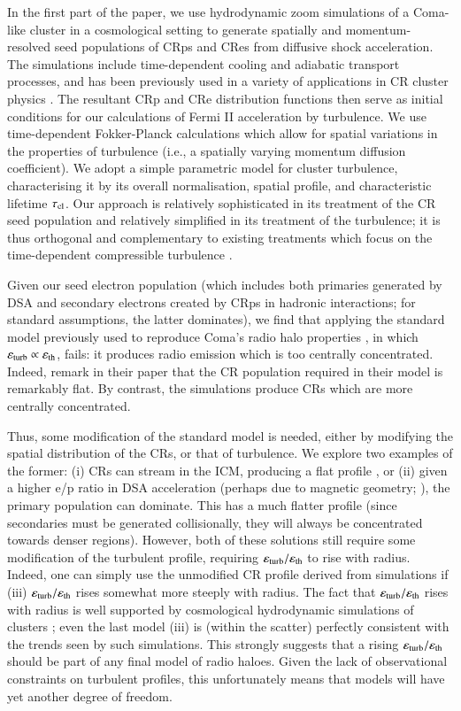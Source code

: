 \documentclass[fleqn,usenatbib,useAMS]{mnras}
\newcommand{\eps}{\varepsilon}
\begin{document}
In the first part of the paper, we use hydrodynamic zoom simulations of a
Coma-like cluster in a cosmological setting to generate spatially and
momentum-resolved seed populations of CRps and CRes from diffusive shock
acceleration. The simulations include time-dependent cooling and adiabatic
transport processes, and has been previously used in a variety of applications
in CR cluster physics \citep{pinzke10,pinzke13}. The resultant CRp and CRe
distribution functions then serve as initial conditions for our calculations of
Fermi II acceleration by turbulence. We use time-dependent Fokker-Planck
calculations which allow for spatial variations in the properties of turbulence
(i.e., a spatially varying momentum diffusion coefficient). We adopt a simple
parametric model for cluster turbulence, characterising it by its overall
normalisation, spatial profile, and characteristic lifetime $\tau_{\rm cl}$. Our
approach is relatively sophisticated in its treatment of the CR seed population
and relatively simplified in its treatment of the turbulence; it is thus
orthogonal and complementary to existing treatments which focus on the
time-dependent compressible turbulence \citep{miniati15}.

Given our seed electron population (which includes both primaries generated by DSA and secondary electrons created by CRps in hadronic interactions; for standard assumptions, the latter dominates), we find that applying the standard model previously used to reproduce Coma's radio halo properties \citep{brunetti11}, in which $\eps_{\rm turb} \propto \eps_{\rm th}$, fails: it produces radio emission which is too centrally concentrated. Indeed, \citet{brunetti11} remark in their paper that the CR population required in their model is remarkably flat. By contrast, the simulations produce CRs which are more centrally concentrated.

Thus, some modification of the standard model is needed, either by modifying the spatial distribution of the CRs, or that of turbulence. We explore two examples of the former: (i) CRs can stream in the ICM, producing a flat profile \citep{ensslin11,wiener13}, or (ii) given a higher e/p ratio in DSA acceleration (perhaps due to magnetic geometry; \citealt{2014ApJ...794..153G}), the primary population can dominate. This has a much flatter profile (since secondaries must be generated collisionally, they will always be concentrated towards denser regions). However, both of these solutions still require some modification of the turbulent profile, requiring $\eps_{\rm turb}/\eps_{\rm th}$ to rise with radius. Indeed, one can simply use the unmodified CR profile derived from simulations if (iii) $\eps_{\rm turb}/\eps_{\rm th}$ rises somewhat more steeply with radius. The fact that $\eps_{\rm turb}/\eps_{\rm th}$ rises with radius is well supported by cosmological hydrodynamic simulations of clusters \citep{2009ApJ...705.1129L,2010ApJ...725.1452S,vazza11}; even the last model (iii) is (within the scatter) perfectly consistent with the trends seen by such simulations. This strongly suggests that a rising $\eps_{\rm turb}/\eps_{\rm th}$ should be part of any final model of radio haloes. Given the lack of observational constraints on turbulent profiles, this unfortunately means that models will have yet another degree of freedom. 
\end{document}
